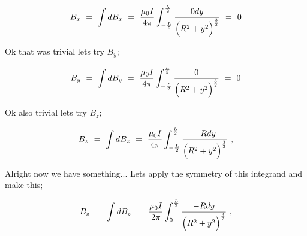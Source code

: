 \documentclass{article}
\begin{document}
\begin{equation} \label{eq:51}
B_x \hspace{0.125cm} = \hspace{0.125cm} \int d B_x \hspace{0.125cm} = \hspace{0.125cm} \frac{\mu_{0} I}{4 \pi} \int_{-\frac{L}{2}}^{\frac{L}{2}} \frac{0 dy}{\Big( R^2 + y^2 \Big)^\frac{3}{2}} \hspace{0.125cm} = \hspace{0.125cm} 0 
\end{equation}

Ok that was trivial lets try \begin{math} B_y \end{math};

\begin{equation} \label{eq:51}
B_y \hspace{0.125cm} = \hspace{0.125cm} \int d B_y \hspace{0.125cm} = \hspace{0.125cm} \frac{\mu_{0} I}{4 \pi} \int_{-\frac{L}{2}}^{\frac{L}{2}} \frac{0}{\Big( R^2 + y^2 \Big)^\frac{3}{2}} \hspace{0.125cm} = \hspace{0.125cm} 0 
\end{equation}

Ok also trivial lets try \begin{math} B_z \end{math};

\begin{equation} \label{eq:51}
B_z \hspace{0.125cm} = \hspace{0.125cm} \int d B_z \hspace{0.125cm} = \hspace{0.125cm} \frac{\mu_{0} I}{4 \pi} \int_{-\frac{L}{2}}^{\frac{L}{2}} \frac{-R dy}{\Big( R^2 + y^2 \Big)^\frac{3}{2}} \hspace{0.125cm} ,
\end{equation}

Alright now we have something... Lets apply the symmetry of this integrand and make this;

\begin{equation} \label{eq:51}
B_z \hspace{0.125cm} = \hspace{0.125cm} \int d B_z \hspace{0.125cm} = \hspace{0.125cm} \frac{\mu_{0} I}{2 \pi} \int_{0}^{\frac{L}{2}} \frac{-R dy}{\Big( R^2 + y^2 \Big)^\frac{3}{2}} \hspace{0.125cm} ,
\end{equation}
\end{document}
